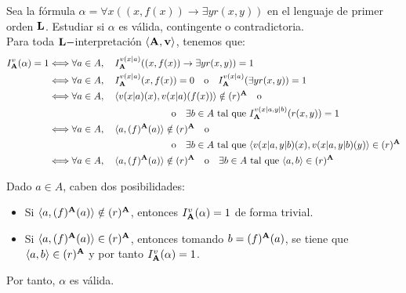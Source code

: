\begin{ejercicio}
    Sea la fórmula $\alpha=\forall x((x,f(x))\rightarrow\exists yr(x,y))$ en el lenguaje de primer orden $\bf{L}$.
    Estudiar si $\alpha$ es válida, contingente o contradictoria.\\

    Para toda $\bf{L}-$interpretación $\langle \bf{A},v\rangle$, tenemos que:
    \begin{align*}
        I_{\bf{A}}^v(\alpha) = 1
        & \Longleftrightarrow \forall a\in A,\quad  I_{\bf{A}}^{v(x|a)}((x,f(x))\rightarrow\exists yr(x,y))=1\\
        & \Longleftrightarrow \forall a\in A,\quad  I_{\bf{A}}^{v(x|a)}(x,f(x))= 0 \quad\text{o}\quad I_{\bf{A}}^{v(x|a)}(\exists yr(x,y))=1\\
        & \Longleftrightarrow \forall a\in A,\quad  \langle v(x|a)(x),v(x|a)(f(x))\rangle\notin (r)^{\bf{A}} \quad\text{o}\\&\hspace{4.5cm}\text{o}\quad \exists b\in A \text{ tal que } I_{\bf{A}}^{v(x|a,y|b)}(r(x,y))=1\\
        & \Longleftrightarrow \forall a\in A,\quad  \langle a,(f)^{\bf{A}}(a)\rangle\notin (r)^{\bf{A}} \quad\text{o}\\&\hspace{4.5cm}\text{o}\quad \exists b\in A \text{ tal que } \langle v(x|a,y|b)(x),v(x|a,y|b)(y)\rangle\in (r)^{\bf{A}}\\
        & \Longleftrightarrow \forall a\in A,\quad  \langle a,(f)^{\bf{A}}(a)\rangle\notin (r)^{\bf{A}} \quad\text{o}\quad \exists b\in A \text{ tal que } \langle a,b\rangle\in (r)^{\bf{A}}
    \end{align*}

    Dado $a\in A$, caben dos posibilidades:
    \begin{itemize}
        \item Si $\langle a,(f)^{\bf{A}}(a)\rangle\notin (r)^{\bf{A}}$, entonces $I_{\bf{A}}^v(\alpha)=1$ de forma trivial.
        \item Si $\langle a,(f)^{\bf{A}}(a)\rangle\in (r)^{\bf{A}}$, entonces tomando $b=(f)^{\bf{A}}(a)$, se tiene que $\langle a,b\rangle\in (r)^{\bf{A}}$ y por tanto $I_{\bf{A}}^v(\alpha)=1$.
    \end{itemize}

    Por tanto, $\alpha$ es válida.
\end{ejercicio}



